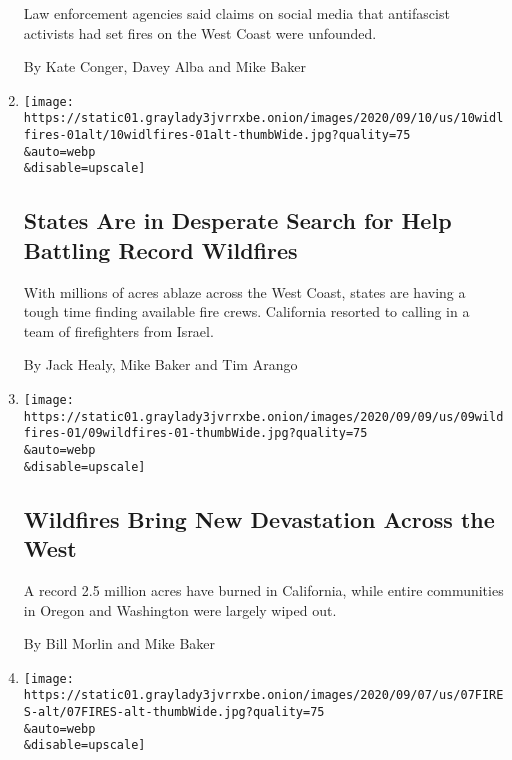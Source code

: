 \begin{enumerate}
  Law enforcement agencies said claims on social media that antifascist
  activists had set fires on the West Coast were unfounded.

  By Kate Conger, Davey Alba and Mike Baker
\item
  \href{/2020/09/10/us/wildfires-help-ca-or-wa.html}{}

  \texttt{[image: https://static01.graylady3jvrrxbe.onion/images/2020/09/10/us/10widlfires-01alt/10widlfires-01alt-thumbWide.jpg?quality=75\\\&auto=webp\\\&disable=upscale]}

  \hypertarget{states-are-in-desperate-search-for-help-battling-record-wildfires}{%
  \subsection{States Are in Desperate Search for Help Battling Record
  Wildfires}\label{states-are-in-desperate-search-for-help-battling-record-wildfires}}

  With millions of acres ablaze across the West Coast, states are having
  a tough time finding available fire crews. California resorted to
  calling in a team of firefighters from Israel.

  By Jack Healy, Mike Baker and Tim Arango
\item
  \href{/2020/09/09/us/fires-washington-california-oregon-malden.html}{}

  \texttt{[image: https://static01.graylady3jvrrxbe.onion/images/2020/09/09/us/09wildfires-01/09wildfires-01-thumbWide.jpg?quality=75\\\&auto=webp\\\&disable=upscale]}

  \hypertarget{wildfires-bring-new-devastation-across-the-west}{%
  \subsection{Wildfires Bring New Devastation Across the
  West}\label{wildfires-bring-new-devastation-across-the-west}}

  A record 2.5 million acres have burned in California, while entire
  communities in Oregon and Washington were largely wiped out.

  By Bill Morlin and Mike Baker
\item
  \href{/2020/09/07/us/ca-wildfires-heatwave.html}{}

  \texttt{[image: https://static01.graylady3jvrrxbe.onion/images/2020/09/07/us/07FIRES-alt/07FIRES-alt-thumbWide.jpg?quality=75\\\&auto=webp\\\&disable=upscale]}

  \hypertarget{california-wildfires-extreme-heat-turns-state-into-a-furnace}{%
}
\end{enumerate}
